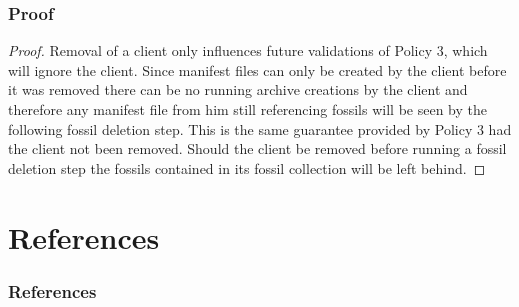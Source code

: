 \documentclass[english,utf8,aspectratio=169]{beamer}
\begin{document}
    \begin{frame}
        \frametitle{Proof}
        \begin{proof}
            Removal of a client only influences future validations of Policy 3, which will ignore
            the client.
            Since manifest files can only be created by the client before it was removed there can
            be no running archive creations by the client and therefore any manifest file from him
            still referencing fossils will be seen by the following fossil deletion step.
            This is the same guarantee provided by Policy 3 had the client not been removed.
            Should the client be removed before running a fossil deletion step the fossils contained
            in its fossil collection will be left behind.
        \end{proof}
    \end{frame}

    \section{References}
    \begin{frame}
        \frametitle{References}
        \printbibliography{}
    \end{frame}
\end{document}
